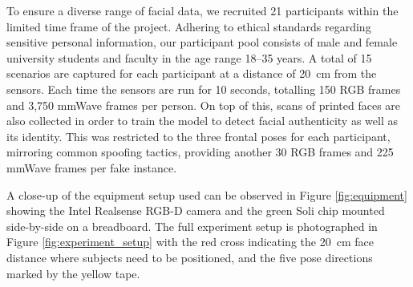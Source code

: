 \documentclass{mpaper}
\begin{document}

To ensure a diverse range of facial data, we recruited 21 participants within the limited time frame of the project. Adhering to ethical standards regarding sensitive personal information, our participant pool consists of male and female university students and faculty in the age range 18--35 years. A total of 15 scenarios are captured for each participant at a distance of \qty{20}{\cm} from the sensors. Each time the sensors are run for 10 seconds, totalling 150 RGB frames and 3,750 mmWave frames per person. On top of this, scans of printed faces are also collected in order to train the model to detect facial authenticity as well as its identity. This was restricted to the three frontal poses for each participant, mirroring common spoofing tactics, providing another 30 RGB frames and 225 mmWave frames per fake instance.

A close-up of the equipment setup used can be observed in Figure \ref{fig:equipment} showing the Intel Realsense RGB-D camera and the green Soli chip mounted side-by-side on a breadboard. The full experiment setup is photographed in Figure \ref{fig:experiment_setup} with the red cross indicating the \qty{20}{\cm} face distance where subjects need to be positioned, and the five pose directions marked by the yellow tape.
\end{document}
